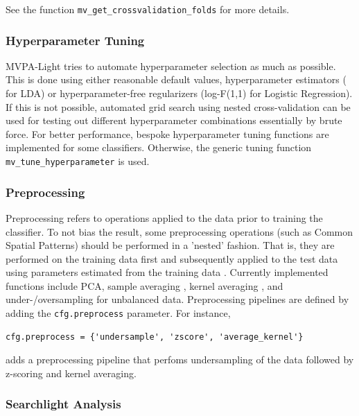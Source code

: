 \documentclass[utf8]{frontiersSCNS} %
\newcommand{\ttt}[1]{\texttt{#1}}
\begin{document}
See the function \ttt{mv\_get\_crossvalidation\_folds} for more details.

\subsubsection{Hyperparameter Tuning}

MVPA-Light tries to automate hyperparameter selection as much as possible. This is done using either reasonable default values, hyperparameter estimators (\cite{Ledoit2004HoneyMatrix} for LDA) or  hyperparameter-free regularizers (log-F(1,1) for Logistic Regression). If this is not possible, automated grid search using nested cross-validation can be used for testing out different hyperparameter combinations essentially by brute force. For better performance, bespoke hyperparameter tuning functions are implemented for some classifiers. Otherwise, the generic tuning function \ttt{mv\_tune\_hyperparameter} is used.

\subsubsection{Preprocessing}\label{sec:preprocessing}

Preprocessing refers to operations applied to the data prior to training the classifier. To not bias the result, some preprocessing operations (such as Common Spatial Patterns) should be performed in a 'nested' fashion. That is, they are performed on the training data first and subsequently applied to the test data using parameters estimated from the training data \citep{Lemm2011,Varoquaux2017}.
Currently implemented functions include PCA, sample averaging \citep{Cichy2017MultivariateSpace}, kernel averaging \citep{Treder2018}, and under-/oversampling for unbalanced data. Preprocessing pipelines are defined by adding the \ttt{cfg.preprocess} parameter. For instance,

\begin{verbatim}
cfg.preprocess = {'undersample', 'zscore', 'average_kernel'}
\end{verbatim}

adds a preprocessing pipeline that perfoms undersampling of the data followed by z-scoring and kernel averaging.

\subsubsection{Searchlight Analysis}\label{sec:searchlight}
\end{document}
